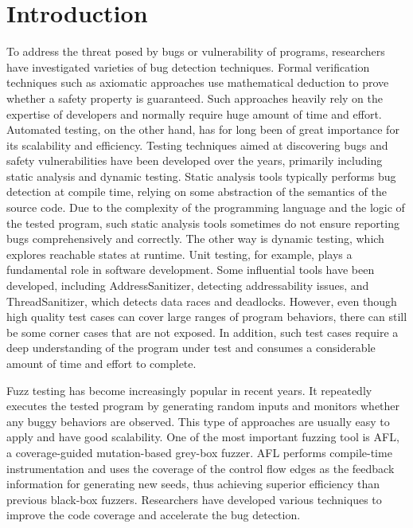 \chapter{\label{cha:intro}Introduction}


To address the threat posed by bugs or vulnerability of programs, researchers have investigated varieties of bug detection techniques. Formal verification techniques such as axiomatic approaches use mathematical deduction to prove whether a safety property is guaranteed. Such approaches heavily rely on the expertise of developers and normally require huge amount of time and effort\cite{sel4}.
Automated testing, on the other hand, has for long been of great importance for its scalability and efficiency. Testing techniques aimed at discovering bugs and safety vulnerabilities have been developed over the years, primarily including static analysis and dynamic testing. Static analysis tools\cite{infer, RacerD} typically performs bug detection at compile time, relying on some abstraction of the semantics of the source code. 
Due to the complexity of the programming language and the logic of the tested program, such static analysis tools sometimes do not ensure reporting bugs comprehensively and correctly. The other way is dynamic testing, which explores reachable states at runtime. Unit testing, for example, plays a fundamental role in software development. Some influential tools have been developed, including AddressSanitizer\cite{ASAN}, detecting addressability issues, and ThreadSanitizer\cite{TSAN}, which detects data races and deadlocks. However, even though high quality test cases can cover large ranges of program behaviors, there can still be some corner cases that are not exposed. In addition, such test cases require a deep understanding of the program under test and consumes a considerable amount of time and effort to complete. 



Fuzz testing has become increasingly popular in recent years. It repeatedly executes the tested program by generating random inputs and monitors whether any buggy behaviors are observed. This type of approaches are usually easy to apply and have good scalability. One of the most important fuzzing tool is AFL\cite{afl}, a coverage-guided mutation-based grey-box fuzzer. AFL performs compile-time instrumentation and uses the coverage of the control flow edges as the feedback information for generating new seeds, thus achieving superior efficiency than previous black-box fuzzers. Researchers have developed various techniques to improve the code coverage and accelerate the bug detection. 

